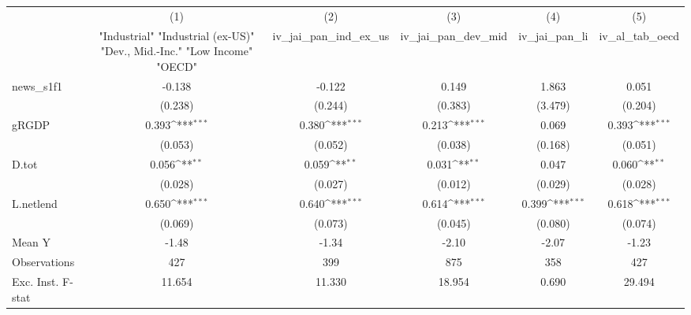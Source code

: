 {
\def\sym#1{\ifmmode^{#1}\else\(^{#1}\)\fi}
\begin{tabular}{l*{5}{c}}
\toprule
            &\multicolumn{1}{c}{(1)}&\multicolumn{1}{c}{(2)}&\multicolumn{1}{c}{(3)}&\multicolumn{1}{c}{(4)}&\multicolumn{1}{c}{(5)}\\
            &\multicolumn{1}{c}{ "Industrial" "Industrial (ex-US)" "Dev., Mid.-Inc." "Low Income" "OECD" }&\multicolumn{1}{c}{iv\_jai\_pan\_ind\_ex\_us}&\multicolumn{1}{c}{iv\_jai\_pan\_dev\_mid}&\multicolumn{1}{c}{iv\_jai\_pan\_li}&\multicolumn{1}{c}{iv\_al\_tab\_oecd}\\
\midrule
news\_s1f1   &      -0.138         &      -0.122         &       0.149         &       1.863         &       0.051         \\
            &     (0.238)         &     (0.244)         &     (0.383)         &     (3.479)         &     (0.204)         \\
\addlinespace
gRGDP       &       0.393\sym{***}&       0.380\sym{***}&       0.213\sym{***}&       0.069         &       0.393\sym{***}\\
            &     (0.053)         &     (0.052)         &     (0.038)         &     (0.168)         &     (0.051)         \\
\addlinespace
D.tot       &       0.056\sym{**} &       0.059\sym{**} &       0.031\sym{**} &       0.047         &       0.060\sym{**} \\
            &     (0.028)         &     (0.027)         &     (0.012)         &     (0.029)         &     (0.028)         \\
\addlinespace
L.netlend   &       0.650\sym{***}&       0.640\sym{***}&       0.614\sym{***}&       0.399\sym{***}&       0.618\sym{***}\\
            &     (0.069)         &     (0.073)         &     (0.045)         &     (0.080)         &     (0.074)         \\
\midrule
Mean Y      &       -1.48         &       -1.34         &       -2.10         &       -2.07         &       -1.23         \\
Observations&         427         &         399         &         875         &         358         &         427         \\
Exc. Inst. F-stat&      11.654         &      11.330         &      18.954         &       0.690         &      29.494         \\
\bottomrule
\end{tabular}
}
